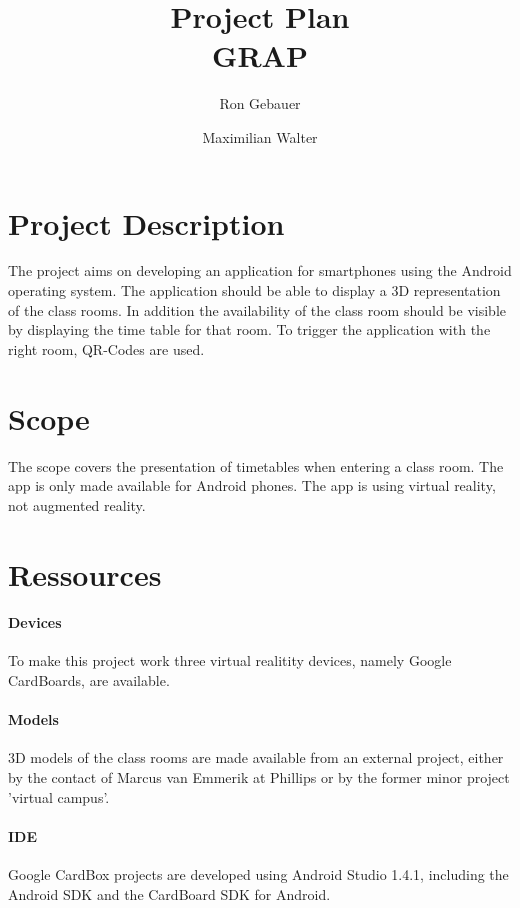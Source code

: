 \documentclass[]{report}
\title{Project Plan \\GRAP}
\author{Ron Gebauer \and Maximilian Walter}
\begin{document}
\maketitle
\setcounter{chapter}{1}
\setcounter{section}{-1}
\section{Project Description}
The project aims on developing an application for smartphones using the Android operating system. The application should be able to display a 3D representation of the class rooms. In addition the availability of the class room should be visible by displaying the time table for that room. To trigger the application with the right room, QR-Codes are used. \\
\section{Scope}
The scope covers the presentation of timetables when entering a class room. The app is only made available for Android phones. The app is using virtual reality, not augmented reality. 
\section{Ressources}

\paragraph{Devices}
To make this project work three virtual realitity devices, namely Google CardBoards, are available. 
\paragraph{Models}
3D models of the class rooms are made available from an external project, either by the contact of Marcus van Emmerik at Phillips or by the former minor project 'virtual campus'. 
\paragraph{IDE}
Google CardBox projects are developed using Android Studio 1.4.1, including the Android SDK and the CardBoard SDK for Android.
\end{document}
